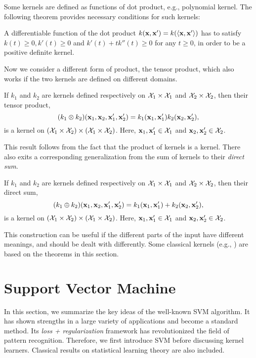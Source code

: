 Some kernels are defined as functions of dot product, e.g., polynomial kernel. The following theorem provides necessary conditions for such kernels:
\begin{theorem}
A differentiable function of the dot product $k(\mathbf{x},\mathbf{x}')=k(\langle\mathbf{x},\mathbf{x}'\rangle)$ has to satisfy $k(t)\geq0,k'(t)\geq0$ and $k'(t)+tk''(t)\geq0$ for any $t\geq0$, in order to be a positive definite kernel.
\end{theorem}
Now we consider a different form of product, the tensor product, which also works if the two kernels are defined on different domains.
\begin{theorem}
If $k_1$ and $k_2$ are kernels defined respectively on ${\cal X}_1\times{\cal X}_1$ and ${\cal X}_2\times{\cal X}_2$, then their tensor product,
\[
(k_1\otimes k_2)(\mathbf{x}_1,\mathbf{x}_2,\mathbf{x}_1',\mathbf{x}_2')=k_1(\mathbf{x}_1,\mathbf{x}_1')k_2(\mathbf{x}_2,\mathbf{x}_2'),
\]
is a kernel on $({\cal X}_1\times{\cal X}_2)\times({\cal X}_1\times{\cal X}_2)$. Here, $\mathbf{x}_1,\mathbf{x}_1'\in{\cal X}_1$ and $\mathbf{x}_2,\mathbf{x}_2'\in{\cal X}_2$.
\end{theorem}
This result follows from the fact that the product of kernels is a kernel. There also exits a corresponding generalization from the sum of kernels to their {\em direct sum}.
\begin{theorem}
If $k_1$ and $k_2$ are kernels defined respectively on ${\cal X}_1\times{\cal X}_1$ and ${\cal X}_2\times{\cal X}_2$, then  their direct sum,
\[
(k_1\oplus k_2)(\mathbf{x}_1,\mathbf{x}_2,\mathbf{x}_1',\mathbf{x}_2')=k_1(\mathbf{x}_1,\mathbf{x}_1')+k_2(\mathbf{x}_2,\mathbf{x}_2'),
\]
is a kernel on $({\cal X}_1\times{\cal X}_2)\times({\cal X}_1\times{\cal X}_2)$. Here, $\mathbf{x}_1,\mathbf{x}_1'\in{\cal X}_1$ and $\mathbf{x}_2,\mathbf{x}_2'\in{\cal X}_2$.
\end{theorem}
This construction can be useful if the different parts of the input have different meanings, and should be dealt with differently. Some classical kernels (e.g., \cite{tr/Haussler99}) are based on the theorems in this section.

\section{Support Vector Machine}

In this section, we summarize the key ideas of the well-known SVM algorithm. It has shown strengths in a large variety of applications and become a standard method. Its {\em loss + regularization} framework has revolutionized the field of pattern recognition. Therefore, we first introduce SVM before discussing kernel learners. Classical results on statistical learning theory are also included.

